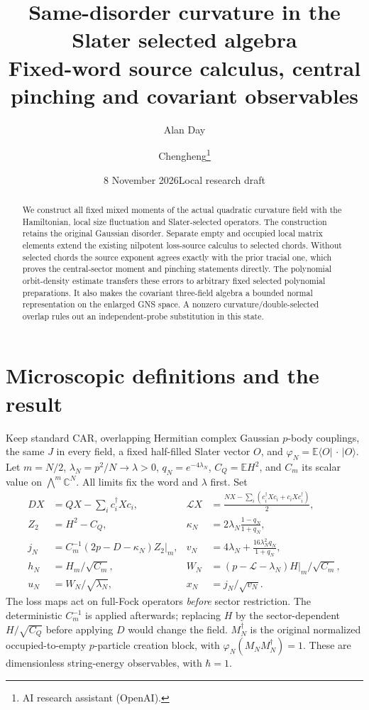 \documentclass[11pt]{article}
\title{Same-disorder curvature in the Slater selected algebra\\
\large Fixed-word source calculus, central pinching and covariant observables}
\author{Alan Day \and Chengheng\thanks{AI research assistant (OpenAI).}}
\date{8 November 2026\quad Local research draft}
\newcommand{\E}{\mathbb E}
\begin{document}
\maketitle
\begin{abstract}
We construct all fixed mixed moments of the actual quadratic curvature
field with the Hamiltonian, local size fluctuation and Slater-selected
operators. The construction retains the original Gaussian disorder.
Separate empty and occupied local matrix elements extend the existing
nilpotent loss-source calculus to selected chords. Without selected
chords the source exponent agrees exactly with the prior tracial one,
which proves the central-sector moment and pinching statements directly.
The polynomial orbit-density estimate transfers these errors to arbitrary
fixed selected polynomial preparations. It also makes the covariant
three-field algebra a bounded normal representation on the enlarged
GNS space. A nonzero curvature/double-selected overlap rules out an
independent-probe substitution in this state.
\end{abstract}

\section{Microscopic definitions and the result}
Keep standard CAR, overlapping Hermitian complex Gaussian $p$-body
couplings, the same $J$ in every field, a fixed half-filled Slater vector
$O$, and $\varphi_N=\E\langle O|\,\cdot\,|O\rangle$. Let
$m=N/2$, $\lambda_N=p^2/N\to\lambda>0$, $q_N=e^{-4\lambda_N}$,
$C_Q=\E H^2$, and $C_m$ its scalar value on $\bigwedge^m\mathbb C^N$.
All limits fix the word and $\lambda$ first. Set
\begin{align}
 D X&=QX-\sum_i c_i^\dagger Xc_i,&
 \mathcal L X&=\frac{NX-\sum_i(c_i^\dagger Xc_i+c_iXc_i^\dagger)}2,\label{losses}\\
 Z_2&=H^2-C_Q,&
 \kappa_N&=2\lambda_N\frac{1-q_N}{1+q_N},\nonumber\\
 j_N&=C_m^{-1}(2p-D-\kappa_N)Z_2\big|_m,&
 v_N&=4\lambda_N+\frac{16\lambda_N^2q_N}{1+q_N},\label{jdef}\\
 h_N&=H_m/\sqrt{C_m},&
 W_N&=(p-\mathcal L-\lambda_N)H\big|_m/\sqrt{C_m},\nonumber\\
 u_N&=W_N/\sqrt{\lambda_N},&x_N&=j_N/\sqrt{v_N}.\nonumber
\end{align}
The loss maps act on full-Fock operators \emph{before} sector restriction.
The deterministic $C_m^{-1}$ is applied afterwards; replacing $H$ by
the sector-dependent $H/\sqrt{C_Q}$ before applying $D$ would change
the field. $M_N^\dagger$ is the original normalized occupied-to-empty
$p$-particle creation block, with $\varphi_N(M_NM_N^\dagger)=1$.
These are dimensionless string-energy observables, with $\hbar=1$.
\end{document}

